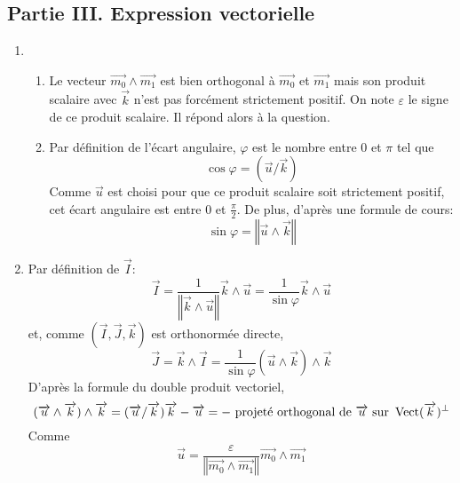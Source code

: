 \subsection*{Partie III. Expression vectorielle}
\begin{enumerate}
 \item 
\begin{enumerate}
 \item Le vecteur $\overrightarrow{m_0}\wedge \overrightarrow{m_1}$ est bien orthogonal à $\overrightarrow{m_0}$ et $\overrightarrow{m_1}$ mais son produit scalaire avec $\overrightarrow{k}$ n'est pas forcément strictement positif. On note $\varepsilon$ le signe de ce produit scalaire. Il répond alors à la question.
 \item Par définition de l'écart angulaire, $\varphi$ est le nombre entre $0$ et $\pi$ tel que 
\begin{displaymath}
\cos\varphi = (\overrightarrow{u}/\overrightarrow{k}) 
\end{displaymath}
Comme $\overrightarrow{u}$ est choisi pour que ce produit scalaire soit strictement positif, cet écart angulaire est entre $0$ et $\frac{\pi}{2}$. De plus, d'après une formule de cours:
\begin{displaymath}
 \sin\varphi = \left \Vert \overrightarrow{u}\wedge \overrightarrow{k}\right\Vert
\end{displaymath}
\end{enumerate}

 \item Par définition de $\overrightarrow{I}$:
\begin{displaymath}
 \overrightarrow{I} 
= \frac{1}{\left \Vert \overrightarrow{k}\wedge \overrightarrow{u}\right\Vert}\overrightarrow{k}\wedge \overrightarrow{u}
= \frac{1}{\sin\varphi}\overrightarrow{k}\wedge \overrightarrow{u}
\end{displaymath}
et, comme $(\overrightarrow{I} ,\overrightarrow{J} ,\overrightarrow{k} )$ est orthonormée directe,
\begin{displaymath}
 \overrightarrow{J}= \overrightarrow{k}\wedge \overrightarrow{I}
=\frac{1}{\sin\varphi}(\overrightarrow{u}\wedge \overrightarrow{k})\wedge \overrightarrow{k}
\end{displaymath}
D'après la formule du double produit vectoriel,
\begin{displaymath}
 (\overrightarrow{u}\wedge \overrightarrow{k})\wedge \overrightarrow{k}
= (\overrightarrow{u}/\overrightarrow{k})\overrightarrow{k} - \overrightarrow{u}
= -\text{ projeté orthogonal de }\overrightarrow{u}\text{ sur } \operatorname{Vect}(\overrightarrow{k})^{\perp}
\end{displaymath}
Comme 
\begin{displaymath}
 \overrightarrow{u} = \frac{\varepsilon}{\left \Vert \overrightarrow{m_0}\wedge \overrightarrow{m_1}\right\Vert}\overrightarrow{m_0}\wedge \overrightarrow{m_1}
\end{displaymath}


\end{enumerate}
